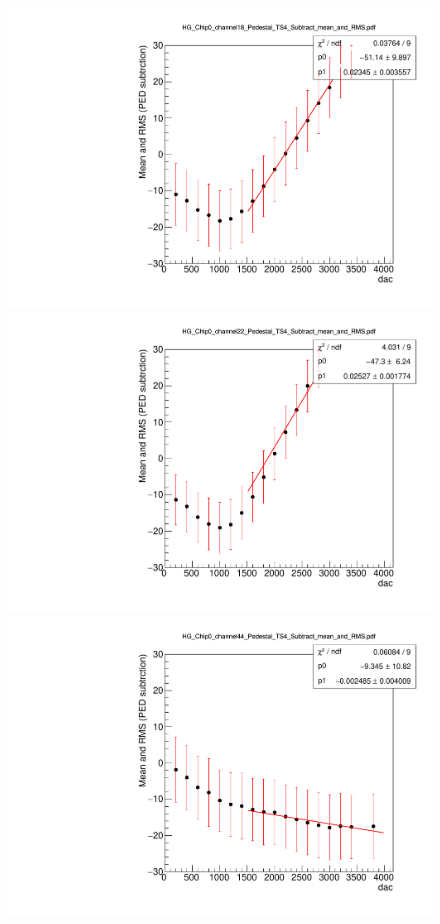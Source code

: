 \begin{figure}[!htb]
\centering
     \includegraphics[width=\cmsFigWidth]{PCB_study/HG_Chip0_channel18_Pedestal_TS4_Subtract_mean_and_RMS.pdf}
     \includegraphics[width=\cmsFigWidth]{PCB_study/HG_Chip0_channel22_Pedestal_TS4_Subtract_mean_and_RMS.pdf}\\
     \includegraphics[width=\cmsFigWidth]{PCB_study/HG_Chip0_channel44_Pedestal_TS4_Subtract_mean_and_RMS.pdf}

\end{figure}
